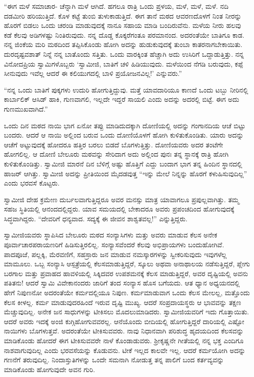  “ಈಗ ಮಳೆ ಸಮಾಚಾರ- ಚೆನ್ನಾಗಿ ಮಳೆ ಆಗಿದೆ. ಹಗಲೂ ರಾತ್ರಿ ಒಂದು ಪ್ರಳಯ, ಮಳೆ, ಮಳೆ, ಮಳೆ. ನದಿ ದಡಮೀರಿ ಹರಿಯುತ್ತಿದೆ. ಕೊಳ ಕಟ್ಟೆ ತುಂಬಿ ತುಳುಕಾಡುತ್ತಿದೆ. ಈಗ ತಾನೆ ಮಠದ ಆವರಣದೊಳಗೆ ನಿಂತ ನೀರನ್ನು ಹೊರಗೆ ಬಿಡಲು ಒಂದು ಚರಂಡಿ ಮಾಡುವುದಕ್ಕೆ ನಾನೂ ಸಹಾಯ ಮಾಡಿ ಬಂದಿರುವೆನು. ಮಳೆಯ ನೀರು ಹಲವು ಕಡೆ ಕೆಲವು ಅಡಿಗಳಷ್ಟು ನಿಂತಿರುವುದು. ನನ್ನ ದೊಡ್ಡ ಕೊಕ್ಕರೆಗಂತೂ ಪರಮಾನಂದ. ಅದರಂತೆಯೇ ಬಾತಿಗೂ ಕಾಡ. ನನ್ನ ಜಿಂಕೆಯ ಮರಿ ಮಠದಿಂದ ತಪ್ಪಿಸಿಕೊಂಡು ಹೋಗಿ ಅದನ್ನು ಹುಡುಕುವುದಕ್ಕೆ ತುಂಬಾ ಕಾತರನಾಗಬೇಕಾಯಿತು. ದುರದೃಷ್ಟವಶಾತ್ ನಿನ್ನೆ ನನ್ನ ಬಾತೊಂದು ಸತ್ತಿತು. ಒಂದು ವಾರಕ್ಕಿಂತ ಹೆಚ್ಚಾಗಿ ಅದು ಉಸಿರಿಗೆ ಒದ್ದಾಡುತ್ತಿತ್ತು. ನನ್ನ ವಿನೋದಪ್ರಿಯ ಸ್ವಾಮಿಗಳೊಬ್ಬರು ‘ಸ್ವಾಮೀಜಿ, ಬಾತಿಗೆ ಚಳಿ ಹಿಡಿಯುವುದು. ಮಳೆಯಿಂದ ನೆಗಡಿ ಬರುವುದು, ಕಪ್ಪೆ ಸೀನುವುದು ಇವೆಲ್ಲ ಆದರೆ ಈ ಕಲಿಯುಗದಲ್ಲಿ ಬಾಳಿ ಪ್ರಯೋಜನವಿಲ್ಲ!’ ಎನ್ನುವರು.” 

 “ನನ್ನ ಒಂದು ಬಾತಿಗೆ ಪುಕ್ಕಗಳು ಉದುರಿ ಹೋಗುತ್ತಿದ್ದುವು. ಮತ್ತೆ ಯಾವದಾರಿಯೂ ಕಾಣದೆ ಒಂದು ಟಬ್ಬು ನೀರಿನಲ್ಲಿ ಕಾರ್ಬಾಲಿಕ್ ಆಸಿಡ್ ಹಾಕಿ, ಗುಣವಾಗಲಿ, ಇಲ್ಲದೇ ಇದ್ದರೆ ಸಾಯಲಿ ಎಂದು ಅದನ್ನು ಅದರಲ್ಲಿ ಬಿಟ್ಟೆ. ಈಗ ಅದು ಗುಣಮುಖವಾಗಿದೆ.”

 ಒಂದು ದಿನ ಮಠದ ನಾಯಿ ಭಾಗ ಏನೋ ತಪ್ಪು ಮಾಡಿದುದಕ್ಕಾಗಿ ದೋಣಿಯಲ್ಲಿ ಅದನ್ನು ಗಂಗಾನದಿಯ ಆಚೆ ಬಿಟ್ಟು ಬಂದರು. ಆದರೆ ಆ ನಾಯಿ ಅಲ್ಲಿಂದ ಬರುವ ಒಂದು ದೋಣಿಯೊಳಗೆ ಹೋಗಿ ಕುಳಿತುಕೊಂಡಿತು. ಯಾರು ಅದನ್ನು ಆಚೆಗೆ ಅಟ್ಟುವುದಕ್ಕೆ ಹೋದರೂ ಹತ್ತಿರ ಬರಲು ಬಿಡದೆ ಬೊಗಳುತ್ತಿತ್ತು. ದೋಣಿಯವರು ಅದರ ತಂಟೆಗೇ ಹೋಗಲಿಲ್ಲ. ಆ ದೋಣಿ ಬೇಲೂರು ಮಠವನ್ನು ಸೇರಿದಾಗ ಅದು ಅಲ್ಲಿಂದ ಪುನಃ ತನ್ನ ಸ್ಥಾನಕ್ಕೆ ರಾತ್ರಿ ಹೋಗಿ ಕುಳಿತುಕೊಂಡಿತ್ತು. ಸ್ವಾಮೀಜಿ ಮಾರನೆ ದಿನ ಬೆಳಿಗ್ಗೆ ಅಷ್ಟು ಹೊತ್ತಿಗೆ ಎದ್ದು ಬಂದಾಗ ಭಾಗ ತನ್ನ ಹಿಂದಿನ ಸ್ಥಾನದಲ್ಲಿ ಹಾಜರ್ ಆಗಿತ್ತು. ಸ್ವಾಮೀಜಿ ಅದನ್ನು ಪ್ರೀತಿಯಿಂದ ಮೈದಡವುತ್ತ “ಇನ್ನು ಮೇಲೆ ನಿನ್ನನ್ನು ಹೊರಗೆ ಕಳುಹಿಸುವುದಿಲ್ಲ” ಎಂದು ಭರವಸೆ ಕೊಟ್ಟರು. 

 ಸ್ವಾಮೀಜಿ ದೇಹ ಕ್ರಮೇಣ ದುರ್ಬಲವಾಗುತ್ತಿದ್ದರೂ ಅವರ ಮನಸ್ಸು ಮಾತ್ರ ಯಾವಾಗಲೂ ಪ್ರಪುಲ್ಲವಾಗಿತ್ತು. ತಮ್ಮ ಸಹಜ ಸ್ಥಿತಿಯಲ್ಲಿ ಆನಂದದಲ್ಲಿದ್ದರು. ಯಾವ ಸಮಯದಲ್ಲಿ ಬೇಕಾದರೂ ಅವರು ಪ್ರಪಂಚದಿಂದ ಹೋಗುವುದಕ್ಕೆ ಸಿದ್ಧವಾಗಿದ್ದರು. “ದೇವರಿಗೆ ಧನ್ಯವಾದ. ಸದ್ಯಕ್ಕೆ ಈ ಜೀವನ ಶಾಶ್ವತವಲ್ಲ!” ಎನ್ನುತ್ತಿದ್ದರು. 

 ಸ್ವಾಮೀಜಿಯವರು ಸ್ಥಾಪಿಸಿದ ಬೇಲೂರು ಮಠದ ಸಂನ್ಯಾಸಿಗಳು ಮತ್ತು ಅವರು ಮಾಡುವ ಕೆಲಸ ಅನೇಕ ಪೂರ್ವಾಚಾರಪರಾಯಣರಿಗೆ ಹಿಡಿಸುತ್ತಿರಲಿಲ್ಲ. ಸಂನ್ಯಾಸವೆಂದರೆ ಕೆಲವು ಅಭಿಪ್ರಾಯಗಳು ಬಂದುಹೋಗಿವೆ. ಪಾದಪೂಜೆ, ಪಲ್ಲಕ್ಕಿ, ಮೆರವಣಿಗೆ, ಸಹಸ್ರಾರು ಜನ ಮಾಡುವ ನಮಸ್ಕಾರಗಳನ್ನು ಸ್ವೀಕರಿಸುವುದು ಇವುಗಳೆಲ್ಲ ಮಾಮೂಲು. ಒಬ್ಬ ಸಂನ್ಯಾಸಿ ಆಸ್ಪತ್ರೆಯಲ್ಲಿ ಕೆಲಸಮಾಡುತ್ತಿದ್ದರೆ, ಸ್ಕೂಲು ಅಥವಾ ಅನಾಥಾಲಯ ನಡೆಸುತ್ತಿದ್ದರೆ, ಪ್ಲೇಗು ಬರಗಾಲ ಮತ್ತು ಪ್ರವಾಹದ ಹಾವಳಿಯಲ್ಲಿ ಸಿಕ್ಕಿದವರ ಉಪಶಮನಕ್ಕೆ ಕೆಲಸ ಮಾಡುತ್ತಿದ್ದರೆ, ಅವರ ದೃಷ್ಟಿಯಲ್ಲಿ ಅವನು ಪತಿತನು! ಆದರೆ ಸ್ವಾಮಿ ವಿವೇಕಾನಂದರು ಜಾರಿಗೆ ತಂದ ಸಂನ್ಯಾಸ ಹೊಸ ಬಗೆಯದು. ಆತ ಧ್ಯಾನ ಅಧ್ಯಯನದಲ್ಲಿ ಹೇಗೆ ನಿಪುಣನೋ ಅದರಂತೆಯೇ ಕರ್ಮದಲ್ಲಿಯೂ ನಿಪುಣ. ಕರ್ಮಮಾಡುವಾಗ ಒಂದು ಕೆಲಸ ಮೇಲಲ್ಲ, ಮತ್ತೊಂದು ಕೆಲಸ ಕೀಳಲ್ಲ. ಕರ್ಮ ಮಾಡುವುದರ\break ಹಿಂದೆ ಇರುವ ದೃಷ್ಟಿ ಮುಖ್ಯ. ಆದರೆ ಸಂಪ್ರದಾಯಸ್ಥರು ಆ ಭಾವವನ್ನು ತಕ್ಷಣ ಮೆಚ್ಚುವುದಿಲ್ಲ. ಅನೇಕ ಜನ ಸಾಧುಗಳನ್ನು ಟೀಕಿಸಲು ಮೊದಲುಮಾಡಿದರು. ಸ್ವಾಮೀಜಿಯವರಿಗೆ ಇದು ಗೊತ್ತಾಯಿತು. ಆದರೆ ಅವರು ಇದಕ್ಕೆ ಅಂಜಿ ಕುಗ್ಗಿಹೋಗುವವರಲ್ಲ. ಆನೆಯೊಂದು ಬೀದಿಯಲ್ಲಿ ಹೋಗುತ್ತಿದ್ದರೆ ದಾರಿಯಲ್ಲಿ ಎಷ್ಟೋ ನಾಯಿಗಳು ಬೊಗಳುತ್ತವೆ. ಅದರಂತೆಯೇ ಟೀಕಿಸುವವರು. ನಾವು ನಿಧಾನವಾಗಿ ಪರಿಶುದ್ಧ ಹೃದಯದಿಂದ ಕೆಲಸವನ್ನು ಮಾಡಿಕೊಂಡು ಹೋದರೆ ಈಗ ಟೀಕಿಸುವವರೇ ನಾಳೆ ಕೊಂಡಾಡುವರು. ಶ‍್ರೀಕೃಷ್ಣನೇ ಗೀತೆಯಲ್ಲಿ ನನ್ನ ಭಕ್ತ ಎಂದಿಗೂ ನಾಶವಾಗುವುದಿಲ್ಲ ಎಂದು ಭರವಸೆಯನ್ನು ಕೊಡುವನು. ಟೀಕೆ ಇಲ್ಲದ ಕಾಲವೇ ಇಲ್ಲ. ಆದರೆ ಕರ್ಮಯೋಗಿ ಅದನ್ನು ಗಣನೆಗೆ ತರುವುದಿಲ್ಲ. ನಿಂದಾಸ್ತುತಿಗಳನ್ನು ಒಂದೇ ಸಮನಾಗಿ ನೋಡುತ್ತ ತನ್ನ ಪಾಲಿಗೆ ಬಂದ ಕರ್ತವ್ಯವನ್ನು ಮಾಡಿಕೊಂಡು ಹೋಗುವುದೇ ಅವನ ಗುರಿ. 

